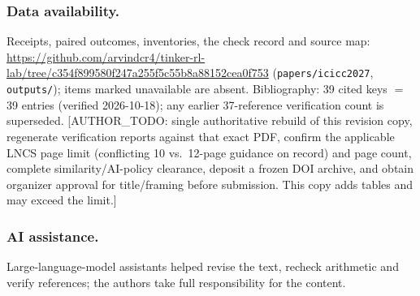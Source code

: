 \documentclass[a4paper,runningheads]{llncs}
\begin{document}
\begin{credits}
\subsubsection{Data availability.} Receipts, paired outcomes, inventories, the
check record and source map:
\url{https://github.com/arvindcr4/tinker-rl-lab/tree/c354f899580f247a255f5c55b8a88152cea0f753}
(\texttt{papers/icicc2027}, \texttt{outputs/}); items marked unavailable
are absent. Bibliography: 39 cited keys $=$ 39 entries (verified
2026-10-18); any earlier 37-reference verification count is superseded.
[AUTHOR\_TODO: single authoritative rebuild of this revision copy,
regenerate verification reports against that exact PDF, confirm the
applicable LNCS page limit (conflicting 10 vs.\ 12-page guidance on
record) and page count, complete similarity/AI-policy clearance, deposit
a frozen DOI archive, and obtain organizer approval for title/framing
before submission. This copy adds tables and may exceed the limit.]
\subsubsection{AI assistance.} Large-language-model assistants helped revise
the text, recheck arithmetic and verify references; the authors take full
responsibility for the content.
\end{credits}


\end{document}
